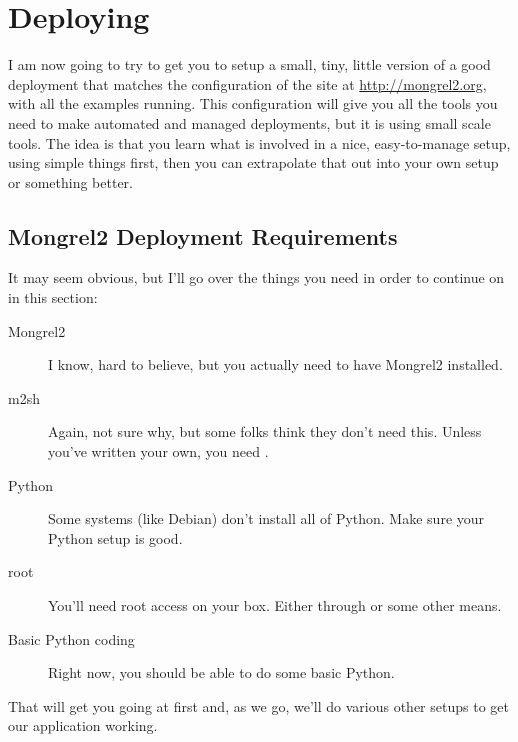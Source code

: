 \chapter{Deploying}

I am now going to try to get you to setup a small, tiny, little version of a good
deployment that matches the configuration of the site at \url{http://mongrel2.org}, with
all the examples running.  This configuration will give you all the tools you
need to make automated and managed deployments, but it is using small scale tools.
The idea is that you learn what is involved in a nice, easy-to-manage setup, using simple
things first, then you can extrapolate that out into your own setup or something
better.


\section{Mongrel2 Deployment Requirements}

It may seem obvious, but I'll go over the things you need in order to continue
on in this section:

\begin{description}
\item [Mongrel2] I know, hard to believe, but you actually need to have Mongrel2 installed.
\item [m2sh] Again, not sure why, but some folks think they don't need this.  Unless you've
    written your own, you need .
\item [Python] Some systems (like Debian) don't install all of Python.  Make sure your Python setup is good.
\item [root] You'll need root access on your box.  Either through  or some other means.
\item [Basic Python coding] Right now, you should be able to do some basic Python.
\end{description}

That will get you going at first and, as we go, we'll do various other setups to
get our application working.

